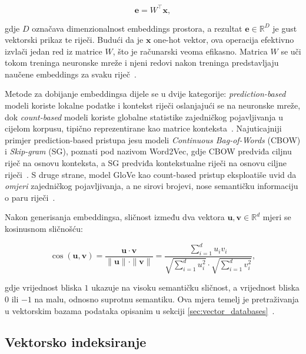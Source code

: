 \begin{equation}
    \mathbf{e} = W^\top \mathbf{x},
    \label{eq:embedding_lookup}
\end{equation}

\noindent gdje $D$ označava dimenzionalnost embeddings prostora, a rezultat
$\mathbf{e} \in \mathbb{R}^D$ je gust vektorski prikaz te riječi.
Budući da je $\mathbf{x}$ one-hot vektor, ova operacija efektivno izvlači
jedan red iz matrice $W$, što je računarski veoma efikasno.
Matrica $W$ se uči tokom treninga neuronske mreže i njeni redovi
nakon treninga predstavljaju naučene embeddings za svaku riječ~\cite{mikolov2013efficient}.

Metode za dobijanje embeddingsa dijele se u dvije kategorije:
\emph{prediction-based} modeli koriste lokalne podatke i kontekst riječi
oslanjajući se na neuronske mreže, dok \emph{count-based} modeli
koriste globalne statistike zajedničkog pojavljivanja u cijelom korpusu,
tipično reprezentirane kao matrice konteksta~\cite{almeida2019word}.
Najuticajniji primjer prediction-based pristupa jesu modeli
\foreignlanguage{english}{\emph{Continuous Bag-of-Words}} (CBOW) i
\foreignlanguage{english}{\emph{Skip-gram}} (SG), poznati pod nazivom
\foreignlanguage{english}{Word2Vec}, gdje CBOW predviđa ciljnu riječ
na osnovu konteksta, a SG predviđa kontekstualne riječi na osnovu
ciljne riječi~\cite{mikolov2013efficient}. S druge strane, model
\foreignlanguage{english}{GloVe} kao
count-based pristup eksploatiše uvid da \emph{omjeri} zajedničkog
pojavljivanja, a ne sirovi brojevi, nose semantičku informaciju o
paru riječi~\cite{pennington2014glove}.

Nakon generisanja embeddingsa, sličnost između dva vektora $\mathbf{u},
\mathbf{v} \in \mathbb{R}^d$ mjeri se kosinusnom sličnošću:

\begin{equation}
    \cos(\mathbf{u}, \mathbf{v}) =
    \frac{\mathbf{u} \cdot \mathbf{v}}{\|\mathbf{u}\| \cdot \|\mathbf{v}\|}
    = \frac{\sum_{i=1}^{d} u_i v_i}
           {\sqrt{\sum_{i=1}^{d} u_i^2} \cdot \sqrt{\sum_{i=1}^{d} v_i^2}},
    \label{eq:cosine}
\end{equation}

\noindent gdje vrijednost bliska $1$ ukazuje na visoku semantičku sličnost, a
vrijednost bliska $0$ ili $-1$ na malu, odnosno suprotnu semantiku. Ova mjera
temelj je pretraživanja u vektorskim bazama podataka opisanim u sekciji
\ref{sec:vector_databases}~\cite{ma2026comprehensive}.

\subsection{Vektorsko indeksiranje}
\label{sec:vektorsko_indeksiranje}

